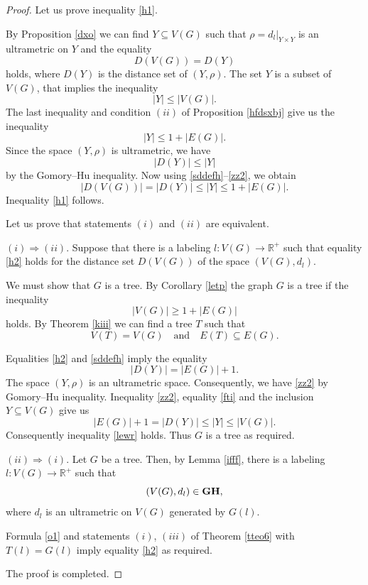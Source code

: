 \documentclass[pdflatex,sn-mathphys-num]{sn-jnl}%
\theoremstyle{thmstyleone}%
\theoremstyle{thmstyletwo}%
\theoremstyle{thmstylethree}%
\theoremstyle{thmstyletwo}%
\theoremstyle{thmstylethree}%
\begin{document}
\begin{proof}
Let us prove inequality \eqref{h1}.

By Proposition \ref{dxo} we can find $Y \subseteq V(G)$ such that
\(\rho=d_l|_{Y\times Y}\) is an ultrametric on $Y$ and the equality
\begin{equation}
    \label{sddefh}
D(V(G)) = D(Y)
\end{equation}
holds, 
where $D(Y)$ is the distance set of $(Y,\rho)$. The set $Y$ is a subset of $V(G)$, that implies the inequality
\[
|Y| \le |V(G)|.
\]
The last inequality and condition $(ii)$ of 
 Proposition \ref{hfdsxbj} give us  the inequality
\begin{equation}
    \label{zz1}
|Y| \le 1 + |E(G)|.
\end{equation}
Since the space $(Y,\rho)$ is ultrametric, we have
\begin{equation}
    \label{zz2}
|D(Y)| \le |Y|
\end{equation}
by  the Gomory--Hu inequality. Now using \eqref{sddefh}--\eqref{zz2}, we obtain
\[
|D(V(G))| = |D(Y)| \le |Y| \le 1 + |E(G)|.
\]
Inequality \eqref{h1} follows.


Let us prove that statements $(i)$ and $(ii)$ are equivalent.

 $(i) \Rightarrow (ii)$. Suppose that there is a labeling
\(
l : V(G) \to \mathbb{R}^+
\)
such that equality \eqref{h2} holds for the distance set $D(V(G))$ of the space $(V(G), d_l)$. 
 
We must show that $G$ is a tree. 
By Corollary \ref{letp} the graph $G$ is a tree if the inequality
\begin{equation}
    \label{lewr}
|V(G)| \geq 1 + |E(G)|
\end{equation}
holds.
By Theorem \ref{kiii} we can find a tree $T$ such that
\begin{equation}
    \label{mhl}
V(T) = V(G) \quad \text{and} \quad E(T) \subseteq E(G).
\end{equation}


Equalities \eqref{h2} and \eqref{sddefh} imply the equality
\begin{equation}
\label{fti}
|D(Y)| = |E(G)| + 1.
\end{equation}
The space $(Y, \rho)$ is an ultrametric space. Consequently, we have \eqref{zz2} by Gomory--Hu inequality. Inequality \eqref{zz2}, equality \eqref{fti} and the inclusion $Y \subseteq V(G)$ give us
\[
|E(G)| + 1 = |D(Y)| \le |Y| \le |V(G)|.
\]
Consequently inequality \eqref{lewr} holds. Thus $G$ is a tree as required.

 $(ii) \Rightarrow(i)$. Let $G$ be a tree. Then, by Lemma \ref{ifff}, there is a labeling
\(
l : V(G) \to \mathbb{R}^+
\)
such that
\begin{equation}
    \label{o1}
(V(G), d_l) \in {\bf GH},
\end{equation}
where $d_l$ is an ultrametric on $V(G)$ generated by $G(l)$.

Formula \eqref{o1} and statements $(i)$, $(iii)$ of Theorem \ref{tteo6} with $T(l)=G(l)$ imply equality \eqref{h2} as required.

The proof is completed. 
\end{proof}
\end{document}
